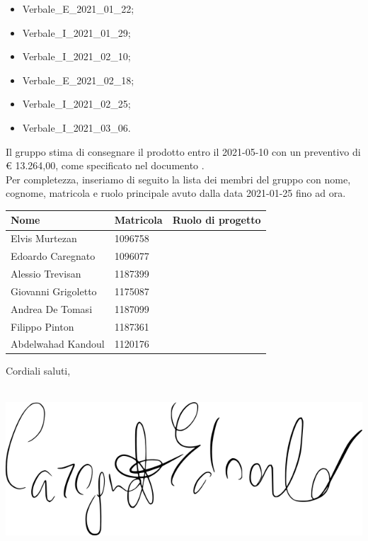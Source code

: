 \documentclass[a4paper, oneside, openany, dvipsnames, table,11pt]{letter}
\begin{document}
\begin{letter}
\begin{itemize}
            \item Verbale\_E\_2021\_01\_22;
            \item Verbale\_I\_2021\_01\_29;
            \item Verbale\_I\_2021\_02\_10;
            \item Verbale\_E\_2021\_02\_18;
            \item Verbale\_I\_2021\_02\_25;
           \item Verbale\_I\_2021\_03\_06.
        \end{itemize}
        Il gruppo stima di consegnare il prodotto entro il 2021-05-10 con un preventivo di \euro{} 13.264,00, come specificato nel documento \PdPv{}.\\
        Per completezza, inseriamo di seguito la lista dei membri del gruppo con nome, cognome, matricola e ruolo principale avuto dalla data 2021-01-25 fino ad ora.
        {
            \renewcommand{\arraystretch}{2}
            \begin{longtable}{ C{4cm} C{3cm} C{6cm} }
                \rowcolor{\primaryColor}
                \textcolor{\secondaryColor}{\textbf{Nome}} & \textcolor{\secondaryColor}{\textbf{Matricola}} & \textcolor{\secondaryColor}{\textbf{Ruolo di progetto}}\\
                \endhead 
                {Elvis Murtezan} & 1096758 & \responsabile{}  \\
                {Edoardo Caregnato} & 1096077 & \responsabile{}  \\
                {Alessio Trevisan} & 1187399 & \analista{}  \\     
                {Giovanni Grigoletto} & 1175087 & \analista{} \\    
                {Andrea De Tomasi} & 1187099 & \programmatore{}   \\     
                {Filippo Pinton} & 1187361 &   \progettista{}  \\    
                {Abdelwahad Kandoul} & 1120176 & \verificatore{}  \\   
            \end{longtable}
        }
        Cordiali saluti,
        \closing{\textit{\responsabile{}}\\ \includegraphics[width=.5\linewidth]{./immagini/firme/edoardo.png}}
    \end{letter}
\end{document}
